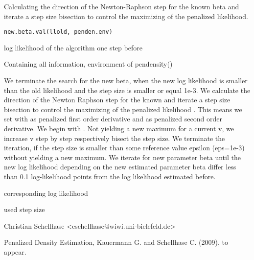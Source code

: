 \begin{Description}\relax
Calculating the direction of the Newton-Raphson step for the known beta and iterate a step size bisection to control the maximizing of the penalized likelihood.
\end{Description}
\begin{Usage}
\begin{verbatim}
new.beta.val(llold, penden.env)
\end{verbatim}
\end{Usage}
\begin{Arguments}
\begin{ldescription}
\item[\code{llold}] log likelihood of the algorithm one step before
\item[\code{penden.env}] Containing all information, environment of pendensity()
\end{ldescription}
\end{Arguments}
\begin{Details}\relax
We terminate the search for the new beta, when the new log likelihood is smaller than the old likelihood and the step size is smaller or equal 1e-3. We calculate the direction of the Newton Raphson step for the known  and iterate a step size bisection to control the maximizing of the penalized likelihood . This means we set  with  as penalized first order derivative and  as penalized second order derivative. We begin with . Not yielding a new maximum for a current v, we increase v step by step respectively bisect the step size. We terminate the iteration, if the step size is smaller than some reference value epsilon (eps=1e-3) without yielding a new maximum. We iterate for new parameter beta until the new log likelihood depending on the new estimated parameter beta differ less than 0.1 log-likelihood points from the log likelihood estimated before.\\
\end{Details}
\begin{Value}
\begin{ldescription}
\item[\code{Likelie}] corresponding log likelihood
\item[\code{step}] used step size
\end{ldescription}
\end{Value}
\begin{Author}\relax
Christian Schellhase <cschellhase@wiwi.uni-bielefeld.de>
\end{Author}
\begin{References}\relax
Penalized Density Estimation, Kauermann G. and Schellhase C. (2009), to appear.
\end{References}

